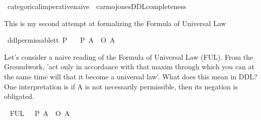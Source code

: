 %
\begin{isabellebody}%
%
%
\isadelimtheory
%
\endisadelimtheory
%
\isatagtheory
{}\isamarkupfalse%
\ categorical{\isacharunderscore}imperative{\isacharunderscore}naive\ \ carmojones{\isacharunderscore}DDL{\isacharunderscore}completeness\isanewline
\isanewline
{}%
\endisatagtheory
{\isafoldtheory}%
%
\isadelimtheory
%
\endisadelimtheory
%
\isadelimdocument
%
\endisadelimdocument
%
\isatagdocument
%
\isamarkuptrue%
%
\isamarkuptrue%
%
\endisatagdocument
{\isafolddocument}%
%
\isadelimdocument
%
\endisadelimdocument
%
\begin{isamarkuptext}%
This is my second attempt at formalizing the Formula of Universal Law%
\end{isamarkuptext}\isamarkuptrue%
\isamarkupfalse%
\ ddlpermissable{\isacharcolon}{\isacharcolon}{\isachardoublequoteopen}t{\isasymRightarrow}t{\isachardoublequoteclose}\ {\isacharparenleft}{\isachardoublequoteopen}P{\isacharunderscore}{\isachardoublequoteclose}{\isacharparenright}\isanewline
\ \ \ {\isachardoublequoteopen}{\isacharparenleft}P\ A{\isacharparenright}\ {\isasymequiv}\ {\isacharparenleft}\isactrlbold {\isasymnot}{\isacharparenleft}O\ {\isacharbraceleft}\isactrlbold {\isasymnot}A{\isacharbraceright}{\isacharparenright}{\isacharparenright}{\isachardoublequoteclose}\isanewline
%
\isanewline
%
\isanewline
%
\isanewline
%
%
\begin{isamarkuptext}%
Let's consider a naive reading of the Formula of Universal Law (FUL).
From the Groundwork, 'act only in accordance with that maxim through which you can at the same time will that it become a universal law'.
What does this mean in DDL? One interpretation is if A is not necessarily permissible, then its negation is obligated.%
\end{isamarkuptext}\isamarkuptrue%
\isamarkupfalse%
\ \isanewline
FUL{\isacharunderscore}{}{\isacharcolon}\ {\isachardoublequoteopen}{\isasymTurnstile}\ {\isacharparenleft}{\isacharparenleft}\isactrlbold {\isasymnot}{\isacharparenleft}{\isasymbox}\ {\isacharparenleft}P\ A{\isacharparenright}{\isacharparenright}{\isacharparenright}\ \isactrlbold {\isasymrightarrow}\ {\isacharparenleft}O\ {\isacharbraceleft}{\isacharparenleft}\isactrlbold {\isasymnot}A{\isacharparenright}{\isacharbraceright}{\isacharparenright}{\isacharparenright}{\isachardoublequoteclose}%

\end{isabellebody}
